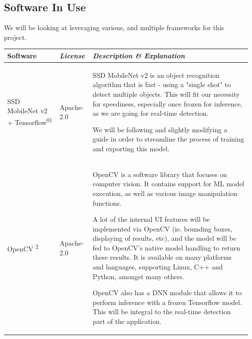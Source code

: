 \documentclass[conference]{IEEEtran}
\begin{document}
\newpage
\subsection{Software In Use}
We will be looking at leveraging various, and multiple frameworks for this project.\\

\begin{table}[!htbp]\normalsize
\begin{center}
\begin{tabular}{|p{1.5cm}|p{1.5cm}|p{4.7cm}|}
\hline
\textbf{Software} & \textbf{\textit{License}}& \textbf{\textit{Description \& Explanation}}\\
\hline
SSD MobileNet v2 + Tensorflow\textsuperscript{0}\textsuperscript{1} & Apache-2.0 &
SSD MobileNet v2 is an object recognition algorithm that is fast - using a "single shot" to detect multiple objects. This will fit our necessity for speediness, especially once frozen for inference, as we are going for real-time detection. 

We will be following and slightly modifying a guide in order to streamline the process of training and exporting this model.
\\ \hline
OpenCV \textsuperscript{2} & Apache-2.0 &
OpenCV is a software library that focuses on computer vision. It contains support for ML model execution, as well as various image manipulation functions.\newline

A lot of the internal UI features will be implemented via OpenCV (ie. bounding boxes, displaying of results, etc), and the model will be fed to OpenCV's native model handling to return these results. It is available on many platforms and languages, supporting Linux, C++ and Python, amongst many others.

OpenCV also has a DNN module that allows it to perform inference with a frozen Tensorflow model. This will be integral to the real-time detection part of the application.
\\ \hline
\end{tabular}
\label{tab1}
\end{center}
\end{table}
\end{document}
